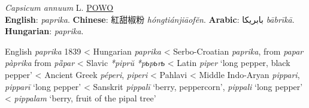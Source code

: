 











\begin{spice}
\textit{Capsicum annuum} L. \hfill
\href{https://powo.science.kew.org/taxon/316944-2}{POWO}
\smallskip \\
\textbf{English}: \textit{paprika}.
\textbf{Chinese}: 紅甜椒粉 \textit{hóngtiánjiāofěn}.
\textbf{Arabic}: بابريكا \textit{bābrīkā}.
\textbf{Hungarian}: \textit{paprika}.
\end{spice}

\begin{etymology}
English \textit{paprika} 1839 
< Hungarian \textit{paprika} 
< Serbo-Croatian \textit{paprika}, from \textit{papar}  \textit{pàprika} from \textit{pȁpar} 
< Slavic \textit{*piprŭ}  \textit{*pьpьrь} 
< Latin  \textit{piper}  `long pepper, black pepper' 
< Ancient Greek \textit{péperi},  \textit{piperi} 
< Pahlavi 
< Middle Indo-Aryan  \textit{pippari},  \textit{pipparī} `long pepper' 
< Sanskrit \textit{pippalī}  `berry, peppercorn',  \textit{pippali} `long pepper' 
< \textit{pippalam} `berry, fruit of the pipal tree' 
\end{etymology}








